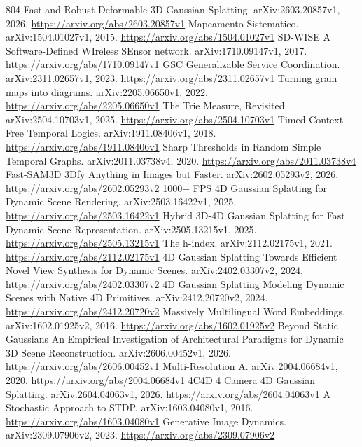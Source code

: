 \documentclass[11pt]{article}
\begin{document}
\begin{thebibliography}{804}
 Fast and Robust Deformable 3D Gaussian Splatting. arXiv:2603.20857v1, 2026. \url{https://arxiv.org/abs/2603.20857v1}
 Mapeamento Sistematico. arXiv:1504.01027v1, 2015. \url{https://arxiv.org/abs/1504.01027v1}
 SD-WISE A Software-Defined WIreless SEnsor network. arXiv:1710.09147v1, 2017. \url{https://arxiv.org/abs/1710.09147v1}
 GSC Generalizable Service Coordination. arXiv:2311.02657v1, 2023. \url{https://arxiv.org/abs/2311.02657v1}
 Turning grain maps into diagrams. arXiv:2205.06650v1, 2022. \url{https://arxiv.org/abs/2205.06650v1}
 The Trie Measure, Revisited. arXiv:2504.10703v1, 2025. \url{https://arxiv.org/abs/2504.10703v1}
 Timed Context-Free Temporal Logics. arXiv:1911.08406v1, 2018. \url{https://arxiv.org/abs/1911.08406v1}
 Sharp Thresholds in Random Simple Temporal Graphs. arXiv:2011.03738v4, 2020. \url{https://arxiv.org/abs/2011.03738v4}
 Fast-SAM3D 3Dfy Anything in Images but Faster. arXiv:2602.05293v2, 2026. \url{https://arxiv.org/abs/2602.05293v2}
 1000+ FPS 4D Gaussian Splatting for Dynamic Scene Rendering. arXiv:2503.16422v1, 2025. \url{https://arxiv.org/abs/2503.16422v1}
 Hybrid 3D-4D Gaussian Splatting for Fast Dynamic Scene Representation. arXiv:2505.13215v1, 2025. \url{https://arxiv.org/abs/2505.13215v1}
 The h-index. arXiv:2112.02175v1, 2021. \url{https://arxiv.org/abs/2112.02175v1}
 4D Gaussian Splatting Towards Efficient Novel View Synthesis for Dynamic Scenes. arXiv:2402.03307v2, 2024. \url{https://arxiv.org/abs/2402.03307v2}
 4D Gaussian Splatting Modeling Dynamic Scenes with Native 4D Primitives. arXiv:2412.20720v2, 2024. \url{https://arxiv.org/abs/2412.20720v2}
 Massively Multilingual Word Embeddings. arXiv:1602.01925v2, 2016. \url{https://arxiv.org/abs/1602.01925v2}
 Beyond Static Gaussians An Empirical Investigation of Architectural Paradigms for Dynamic 3D Scene Reconstruction. arXiv:2606.00452v1, 2026. \url{https://arxiv.org/abs/2606.00452v1}
 Multi-Resolution A. arXiv:2004.06684v1, 2020. \url{https://arxiv.org/abs/2004.06684v1}
 4C4D 4 Camera 4D Gaussian Splatting. arXiv:2604.04063v1, 2026. \url{https://arxiv.org/abs/2604.04063v1}
 A Stochastic Approach to STDP. arXiv:1603.04080v1, 2016. \url{https://arxiv.org/abs/1603.04080v1}
 Generative Image Dynamics. arXiv:2309.07906v2, 2023. \url{https://arxiv.org/abs/2309.07906v2}

\end{thebibliography}
\end{document}
